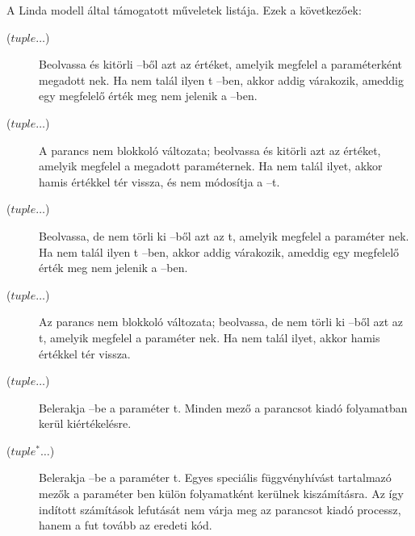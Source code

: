 \begin{defn}\label{def:linda-cmd}
    A Linda modell által támogatott műveletek listája. Ezek a következőek:
    \begin{description}
        \item[($tuple\dots$)]
        Beolvassa és kitörli \ats{}--ből azt az \nes{} értéket, amelyik megfelel a paraméterként megadott \nes{}nek.
        Ha nem talál ilyen \nes{}t \ats{}--ben, akkor addig várakozik, ameddig egy megfelelő érték meg nem jelenik a \ts{}--ben.

        \item[($tuple\dots$)]
        A  parancs nem blokkoló változata; beolvassa és kitörli azt az \nes{} értéket, amelyik megfelel a megadott \nes{} paraméternek.
        Ha nem talál ilyet, akkor hamis értékkel tér vissza, és nem módosítja a \ts--t.

        \item[($tuple\dots$)]
        Beolvassa, de nem törli ki \ats{}--ből azt az \nes{}t, amelyik megfelel a paraméter \nes{}nek.
        Ha nem talál ilyen \nes{}t \ats{}--ben, akkor addig várakozik, ameddig egy megfelelő érték meg nem jelenik a \ts--ben.

        \item[($tuple\dots$)]
        Az  parancs nem blokkoló változata; beolvassa, de nem törli ki \ats{}--ből azt az \nes{}t, amelyik megfelel a paraméter \nes{}nek.
        Ha nem talál ilyet, akkor hamis értékkel tér vissza.

        \item[($tuple\dots$)]
        Belerakja \ats{}--be a paraméter \nes{}t.
        Minden mező a parancsot kiadó folyamatban kerül kiértékelésre.

        \item[($tuple^*\dots$)]
        Belerakja \ats{}--be a paraméter \nes{}t.
        Egyes speciális függvényhívást tartalmazó mezők a paraméter \nes{}ben külön folyamatként kerülnek kiszámításra.
        Az így indított számítások lefutását nem várja meg az parancsot kiadó processz, hanem a fut tovább az eredeti kód.
    \end{description}
\end{defn}

